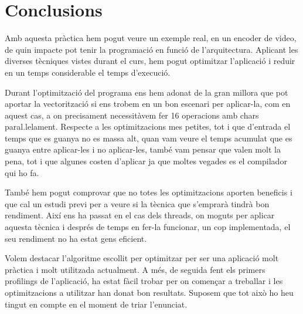 \chapter{Conclusions}

Amb aquesta pràctica hem pogut veure un exemple real, en un encoder de video, de quin impacte pot tenir la programació en funció de l'arquitectura. Aplicant les diverses tècniques vistes durant el curs, hem pogut optimitzar l'aplicació i reduir en un temps considerable el temps d'execució.

Durant l'optimització del programa ens hem adonat de la gran millora que pot aportar la vectorització si ens trobem en un bon escenari per aplicar-la, com en aquest cas, a on precisament necessitàvem fer 16 operacions amb chars paral.lelament. Respecte a les optimitzacions mes petites, tot i que d'entrada el temps que es guanya no es massa alt, quan vam veure el temps acumulat que es guanya entre aplicar-les i no aplicar-les, també vam pensar que valen molt la pena, tot i que algunes costen d'aplicar ja que moltes vegades es el compilador qui ho fa.

També hem pogut comprovar que no totes les optimitzacions aporten beneficis i que cal un estudi previ per a veure si la tècnica que s'emprarà tindrà bon rendiment. Així ens ha passat en el cas dels threads, on moguts per aplicar aquesta tècnica i després de temps en fer-la funcionar, un cop implementada, el seu rendiment no ha estat gens eficient. 

Volem destacar l'algoritme escollit per optimitzar per ser una aplicació molt pràctica i molt utilitzada actualment. A més, de seguida fent els primers profilings de l'aplicació, ha estat fàcil trobar per on començar a treballar i les optimitzacions a utilitzar han donat bon resultats. Suposem que tot això ho heu tingut en compte en el moment de triar l'enunciat.
